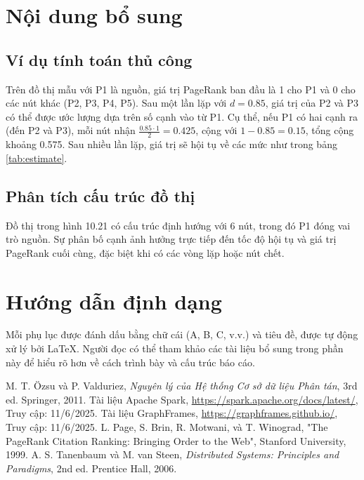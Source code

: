 \documentclass[conference]{IEEEtran}
\begin{document}
\appendices
\section{Nội dung bổ sung} \label{App:WhatGoes}

\subsection{Ví dụ tính toán thủ công}
Trên đồ thị mẫu với P1 là nguồn, giá trị PageRank ban đầu là 1 cho P1 và 0 cho các nút khác (P2, P3, P4, P5). Sau một lần lặp với \( d = 0.85 \), giá trị của P2 và P3 có thể được ước lượng dựa trên số cạnh vào từ P1. Cụ thể, nếu P1 có hai cạnh ra (đến P2 và P3), mỗi nút nhận \( \frac{0.85 \cdot 1}{2} = 0.425 \), cộng với \( 1 - 0.85 = 0.15 \), tổng cộng khoảng 0.575. Sau nhiều lần lặp, giá trị sẽ hội tụ về các mức như trong bảng \ref{tab:estimate}.
\subsection{Phân tích cấu trúc đồ thị}
Đồ thị trong hình 10.21 có cấu trúc định hướng với 6 nút, trong đó P1 đóng vai trò nguồn. Sự phân bố cạnh ảnh hưởng trực tiếp đến tốc độ hội tụ và giá trị PageRank cuối cùng, đặc biệt khi có các vòng lặp hoặc nút chết.
\section{Hướng dẫn định dạng} \label{App:Formatting}
Mỗi phụ lục được đánh dấu bằng chữ cái (A, B, C, v.v.) và tiêu đề, được tự động xử lý bởi LaTeX. Người đọc có thể tham khảo các tài liệu bổ sung trong phần này để hiểu rõ hơn về cách trình bày và cấu trúc báo cáo.

\begin{thebibliography}{1}
M. T. Özsu và P. Valduriez, \emph{Nguyên lý của Hệ thống Cơ sở dữ liệu Phân tán}, 3rd ed. Springer, 2011.
Tài liệu Apache Spark, \url{https://spark.apache.org/docs/latest/}, Truy cập: 11/6/2025.
Tài liệu GraphFrames, \url{https://graphframes.github.io/}, Truy cập: 11/6/2025.
L. Page, S. Brin, R. Motwani, và T. Winograd, "The PageRank Citation Ranking: Bringing Order to the Web", Stanford University, 1999.
A. S. Tanenbaum và M. van Steen, \emph{Distributed Systems: Principles and Paradigms}, 2nd ed. Prentice Hall, 2006.
\end{thebibliography}
\end{document}
